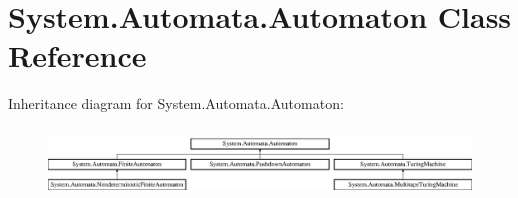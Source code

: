 \hypertarget{class_system_1_1_automata_1_1_automaton}{}\section{System.\+Automata.\+Automaton Class Reference}
\label{class_system_1_1_automata_1_1_automaton}
Inheritance diagram for System.\+Automata.\+Automaton\+:\begin{figure}[H]
\begin{center}
\leavevmode
\includegraphics[height=1.848185cm]{class_system_1_1_automata_1_1_automaton}
\end{center}
\end{figure}
